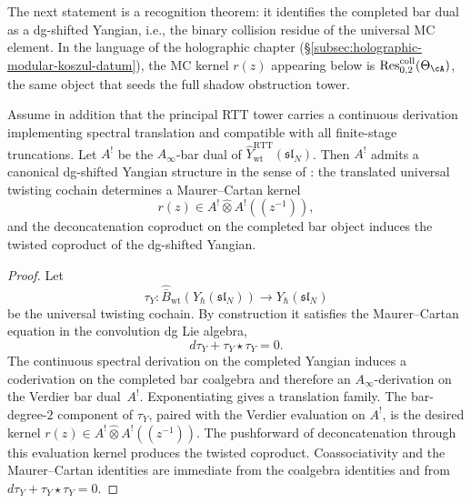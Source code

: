 The next statement is a recognition theorem: it identifies the
completed bar dual as a dg-shifted Yangian, i.e., the binary collision
residue of the universal MC element. In the language of the holographic
chapter (\S\ref{subsec:holographic-modular-koszul-datum}), the
MC kernel $r(z)$ appearing below is
$\operatorname{Res}^{\mathrm{coll}}_{0,2}(\Theta_\cA)$, the same
object that seeds the full shadow obstruction tower.

\begin{theorem}
\ClaimStatusProvedHere
\label{thm:recognition-completed-dg-shifted-yangian}
Assume in addition that the principal RTT tower carries a continuous
derivation implementing spectral translation and compatible with all
finite-stage truncations. Let $A^!$ be the $A_\infty$-bar dual of
$\widehat Y^{\mathrm{RTT}}_{\mathrm{wt}}(\mathfrak{sl}_N)$. Then $A^!$
admits a canonical dg-shifted Yangian structure in the sense of
\cite{DNP25}: the translated universal twisting cochain determines a
Maurer--Cartan kernel
\begin{equation}
r(z)\in A^!\widehat\otimes A^!((z^{-1})),
\end{equation}
and the deconcatenation coproduct on the completed bar object induces the
twisted coproduct of the dg-shifted Yangian.
\end{theorem}

\begin{proof}
Let
\begin{equation}
\tau_Y:\widehat{\bar B}_{\mathrm{wt}}(Y_\hbar(\mathfrak{sl}_N))
\longrightarrow Y_\hbar(\mathfrak{sl}_N)
\end{equation}
be the universal twisting cochain. By construction it satisfies the
Maurer--Cartan equation in the convolution dg Lie algebra,
\begin{equation}
d\tau_Y+\tau_Y\star\tau_Y=0.
\end{equation}
The continuous spectral derivation on the completed Yangian induces a
coderivation on the completed bar coalgebra and therefore an
$A_\infty$-derivation on the Verdier bar dual~$A^!$. Exponentiating gives
a translation family. The bar-degree-$2$ component of $\tau_Y$, paired
with the Verdier evaluation on $A^!$, is the desired kernel
$r(z)\in A^!\widehat\otimes A^!((z^{-1}))$. The pushforward of
deconcatenation through this evaluation kernel produces the twisted
coproduct. Coassociativity and the Maurer--Cartan identities are
immediate from the coalgebra identities and from
$d\tau_Y+\tau_Y\star\tau_Y=0$.
\end{proof}

